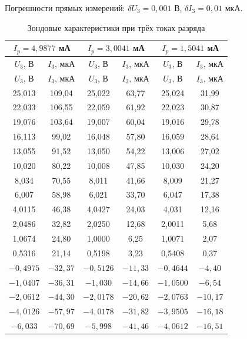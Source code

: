 \documentclass[a4paper]{article}
\begin{document}
	Погрешности прямых измерений: $\delta U_3 = 0{,}001$ В, $\delta I_3 = 0{,}01$ мкА.
	
	\begin{longtable}{|c|c||c|c||c|c|}
		\caption{Зондовые характеристики при трёх токах разряда}
		\label{tab:probes} \\
		\hline
		\multicolumn{2}{|c||}{$I_p = 4{,}9877$ мА} & \multicolumn{2}{c||}{$I_p = 3{,}0041$ мА} & \multicolumn{2}{c|}{$I_p = 1{,}5041$ мА} \\
		\hline
		$U_3$, В & $I_3$, мкА & $U_3$, В & $I_3$, мкА & $U_3$, В & $I_3$, мкА \\
		\hline
		\endfirsthead
		\hline
		$U_3$, В & $I_3$, мкА & $U_3$, В & $I_3$, мкА & $U_3$, В & $I_3$, мкА \\
		\hline
		\endhead
		25{,}013 & 109{,}04 & 25{,}022 & 63{,}77 & 25{,}024 & 31{,}99 \\
		22{,}033 & 106{,}55 & 22{,}059 & 61{,}92 & 22{,}023 & 30{,}87 \\
		19{,}076 & 103{,}64 & 19{,}007 & 60{,}04 & 19{,}016 & 29{,}78 \\
		16{,}113 & 99{,}02 & 16{,}048 & 57{,}80 & 16{,}059 & 28{,}64 \\
		13{,}055 & 91{,}52 & 13{,}050 & 54{,}22 & 13{,}006 & 27{,}02 \\
		10{,}020 & 80{,}22 & 10{,}008 & 47{,}85 & 10{,}030 & 24{,}20 \\
		8{,}034 & 70{,}55 & 8{,}011 & 41{,}66 & 8{,}009 & 21{,}27 \\
		6{,}007 & 58{,}98 & 6{,}021 & 33{,}70 & 6{,}047 & 17{,}38 \\
		4{,}0115 & 46{,}38 & 4{,}0427 & 24{,}03 & 4{,}031 & 12{,}16 \\
		2{,}0486 & 32{,}82 & 2{,}0250 & 12{,}68 & 2{,}0011 & 5{,}68 \\
		1{,}0674 & 24{,}80 & 1{,}0000 & 6{,}25 & 1{,}0071 & 2{,}07 \\
		0{,}5316 & 21{,}14 & 0{,}5198 & 3{,}23 & 0{,}5408 & 0{,}37 \\
		$-0{,}4975$ & $-32{,}37$ & $-0{,}5126$ & $-11{,}33$ & $-0{,}4644$ & $-4{,}40$ \\
		$-1{,}0407$ & $-36{,}31$ & $-1{,}030$ & $-14{,}66$ & $-1{,}0500$ & $-6{,}54$ \\
		$-2{,}0612$ & $-44{,}30$ & $-2{,}0178$ & $-20{,}62$ & $-2{,}0763$ & $-10{,}17$ \\
		$-4{,}0126$ & $-57{,}97$ & $-4{,}0178$ & $-31{,}82$ & $-3{,}9505$ & $-16{,}18$ \\
		$-6{,}033$ & $-70{,}69$ & $-5{,}998$ & $-41{,}46$ & $-4{,}0612$ & $-16{,}51$ \\

\end{longtable}
\end{document}
